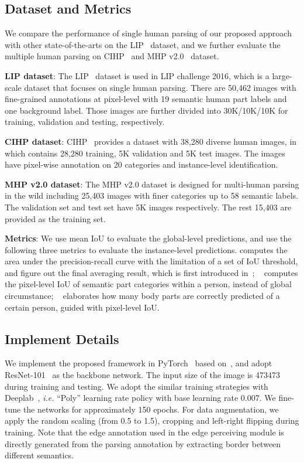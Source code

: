 \documentclass[letterpaper]{article} \usepackage{formatting-instructions-latex-2019}  \usepackage{times}  \usepackage{helvet}  \usepackage{courier}  \usepackage{url}  \usepackage{graphicx}  \frenchspacing  \setlength{\pdfpagewidth}{8.5in}  \setlength{\pdfpageheight}{11in}
\newcommand{\ie}{\emph{i.e. }}
\begin{document}
\subsection{Dataset and Metrics}
We compare the performance of single human parsing of our proposed approach with other state-of-the-arts on the LIP~\cite{Liang2018} dataset, and we further evaluate the multiple human parsing on CIHP~\cite{gong2018instance} and MHP v2.0~\cite{Li2017} dataset.

\noindent\textbf{LIP dataset}: The LIP~\cite{Liang2017} dataset is used in LIP challenge 2016, which is a large-scale dataset that focuses on single human parsing. There are 50,462 images with fine-grained annotations at pixel-level with 19 semantic human part labels and one background label. Those images are further divided into 30K/10K/10K for training, validation and testing, respectively.

\noindent\textbf{CIHP dataset}: CIHP~\cite{gong2018instance} provides a dataset with 38,280 diverse human images, in which contains 28,280 training, 5K validation and 5K test images. The images have pixel-wise annotation on 20 categories and instance-level identification.   

\noindent\textbf{MHP v2.0 dataset}: The MHP v2.0 dataset is designed for multi-human parsing in the wild including 25,403 images with finer categories up to 58 semantic labels. The validation set and test set have 5K images respectively. The rest 15,403 are provided as the training set.  

\noindent\textbf{Metrics}: We use mean IoU to evaluate the global-level predictions, and use the following three metrics to evaluate the instance-level predictions.  computes the area under the precision-recall curve with the limitation of a set of IoU threshold, and figure out the final averaging result, which is first introduced in~\cite{hariharan2014simultaneous}; ~\cite{Li2017} computes the pixel-level IoU of semantic part categories within a person, instead of global circumstance; ~\cite{Li2017} elaborates how many body parts are correctly predicted of a certain person, guided with pixel-level IoU.


\subsection{Implement Details}

  We implement the proposed framework in PyTorch~\cite{paszke2017automatic} based on~\cite{torch2018segment}, and adopt ResNet-101~\cite{He2016} as the backbone network. The input size of the image is 473473 during training and testing. We adopt the similar training strategies with Deeplab~\cite{Chen2018a}, \ie ``Poly'' learning rate policy with base learning rate 0.007. We fine-tune the networks for approximately 150 epochs. For data augmentation, we apply the random scaling (from 0.5 to 1.5), cropping and left-right flipping during training. Note that the edge annotation used in the edge perceiving module is directly generated from the parsing annotation by extracting border between different semantics. 
\end{document}
